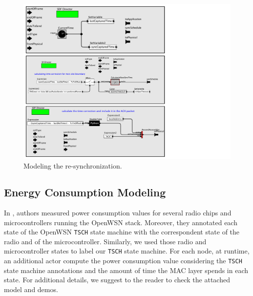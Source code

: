 \begin{figure}[t]
\centering
\includegraphics[width=\columnwidth]{figures/PaperReSynchronization}
\caption{\small Modeling the re-synchronization.}
\label{fig:timeCorrection}
\end{figure}


\subsection{Energy Consumption Modeling}
\label{sec:energy}

In \cite{vilajosana2013realistic}, authors measured power consumption values  for several radio chips and microcontrollers running the OpenWSN stack. Moreover, they annotated each state of the OpenWSN \texttt{TSCH} state machine with the correspondent state of the radio and of the microcontroller.
Similarly, we used those radio and microcontroller states to label our \texttt{TSCH} state machine.
For each node, at runtime, an additional actor compute the power consumption value considering the \texttt{TSCH} state machine annotations and the amount of time the MAC layer spends in each state.
For additional details, we suggest to the reader to check the attached model and demos.



